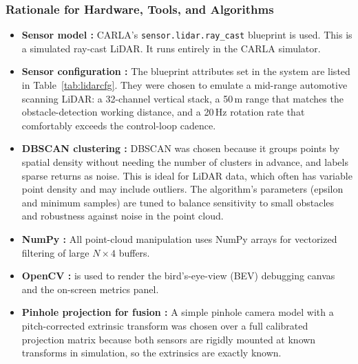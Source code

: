 \documentclass[12pt, a4paper]{report}
\begin{document}
\subsubsection{Rationale for Hardware, Tools, and Algorithms}

\begin{itemize}
    \item \textbf{Sensor model :} CARLA's \texttt{sensor.lidar.ray\_cast}
    blueprint is used. This is a simulated ray-cast LiDAR. 
    It runs entirely in the CARLA simulator.
    

    \item \textbf{Sensor configuration :} The blueprint attributes set in
    the system are listed in Table~\ref{tab:lidarcfg}. They were chosen to
    emulate a mid-range automotive scanning LiDAR: a 32-channel vertical stack,
    a 50\,m range that matches the obstacle-detection working distance, and a
    20\,Hz rotation rate that comfortably exceeds the control-loop cadence.

    \item \textbf{DBSCAN clustering :} DBSCAN was chosen because it groups points by spatial density
    without needing the number of clusters in advance, and labels sparse returns
    as noise. This is ideal for LiDAR data, which often has variable point density and may include outliers.
    The algorithm's parameters (epsilon and minimum samples) are tuned to balance sensitivity to small obstacles
    and robustness against noise in the point cloud.

    \item \textbf{NumPy :} All point-cloud manipulation uses NumPy arrays for vectorized
    filtering of large $N \times 4$ buffers.

    \item \textbf{OpenCV :} is used to render the bird's-eye-view
    (BEV) debugging canvas and the on-screen metrics panel.

    \item \textbf{Pinhole projection for fusion :} A simple pinhole camera model
    with a pitch-corrected extrinsic transform was chosen over a full calibrated
    projection matrix because both sensors are rigidly mounted at known
    transforms in simulation, so the extrinsics are exactly known.
\end{itemize}
\end{document}
